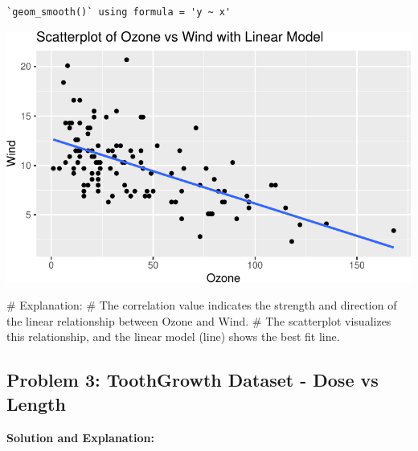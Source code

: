 \documentclass[
  letterpaper,
  DIV=11,
  numbers=noendperiod]{scrreprt}
\newenvironment{Shaded}{\begin{snugshade}}{\end{snugshade}}
\newcommand{\CommentTok}[1]{\textcolor[rgb]{0.37,0.37,0.37}{#1}}
\newcommand{\FunctionTok}[1]{\textcolor[rgb]{0.28,0.35,0.67}{#1}}
\newcommand{\NormalTok}[1]{\textcolor[rgb]{0.00,0.23,0.31}{#1}}
\newcommand{\OtherTok}[1]{\textcolor[rgb]{0.00,0.23,0.31}{#1}}
\newcommand{\SpecialCharTok}[1]{\textcolor[rgb]{0.37,0.37,0.37}{#1}}
\begin{document}
\begin{verbatim}
`geom_smooth()` using formula = 'y ~ x'
\end{verbatim}

\includegraphics{Linear_Modeling_and_Regression_files/figure-pdf/unnamed-chunk-17-1.pdf}

\begin{Shaded}
\begin{Highlighting}[]
\CommentTok{\# Explanation:}
\CommentTok{\# The correlation value indicates the strength and direction of the linear relationship between Ozone and Wind.}
\CommentTok{\# The scatterplot visualizes this relationship, and the linear model (line) shows the best fit line.}
\end{Highlighting}
\end{Shaded}

\subsection*{Problem 3: ToothGrowth Dataset - Dose vs
Length}\label{problem-3-toothgrowth-dataset---dose-vs-length-1}

\textbf{Solution and Explanation:}

\begin{Shaded}
\end{Shaded}
\end{document}
